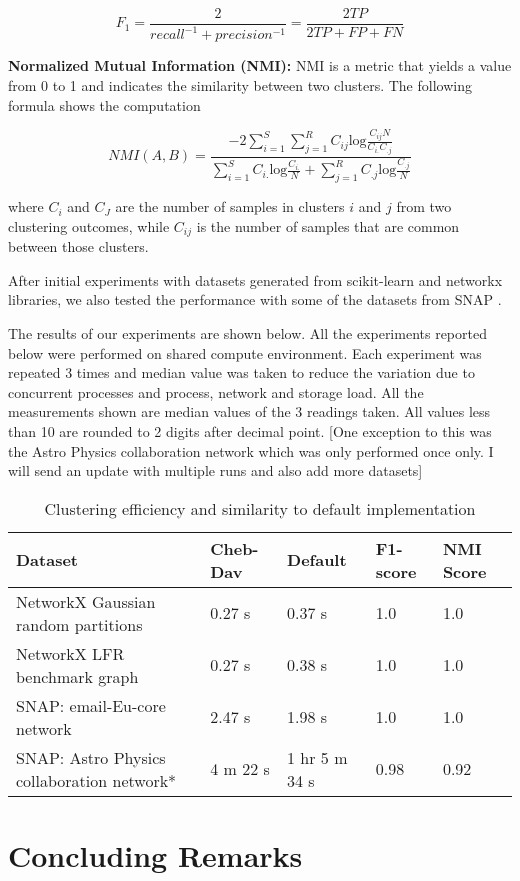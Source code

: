 \documentclass[10pt,a4paper, nocenter]{article}
\begin{document}
    $$F_{1} = \frac{2}{recall^{-1}+precision^{-1}} = \frac{2TP}{2TP+FP+FN}$$
    
    \textbf{Normalized Mutual Information (NMI):} NMI is a metric that yields a value from 0 to 1 and indicates the similarity between two clusters. The following formula shows the computation
    
    $$NMI\left(A,B\right)=\frac{-2\sum_{i=1}^{S}\sum_{j=1}^{R}{C}_{ij}{\text{log}}\frac{{C}_{ij}N}{{C}_{i.}{C}_{.j}}}{\sum_{i=1}^{S}{C}_{i.}{\text{log}}\frac{{C}_{i.}}{N}+\sum_{j=1}^{R}{C}_{.j}{\text{log}}\frac{{C}_{.j}}{N}}$$
    
    where $C_i$ and $C_J$ are the number of samples in clusters $i$ and $j$ from two clustering outcomes, while $C_{ij}$ is the number of samples that are common between those clusters.
    
    
    After initial experiments with datasets generated from scikit-learn and networkx libraries, we also tested the performance with some of the datasets from SNAP \cite{snapnets}.
    
    The results of our experiments are shown below. All the experiments reported below were performed on shared compute environment. Each experiment was repeated 3 times and median value was taken to reduce the variation due to concurrent processes and process, network and storage load. All the measurements shown are median values of the 3 readings taken. All values less than 10 are rounded to 2 digits after decimal point. [One exception to this was the Astro Physics collaboration network which was only performed once only. I will send an update with multiple runs and also add more datasets]
    
	\begin{table}[]
		\centering
		\begin{tabular}{|l|l|l|l|l|}
			\hline
			Dataset & Cheb-Dav & Default & F1-score & NMI Score \\ \hline
			NetworkX Gaussian random partitions & 0.27 s & 0.37 s & 1.0 & 1.0 \\ \hline
			NetworkX LFR benchmark graph & 0.27 s & 0.38 s  & 1.0 & 1.0 \\ \hline
			SNAP: email-Eu-core network & 2.47 s & 1.98 s & 1.0 & 1.0 \\ \hline
			SNAP: Astro Physics collaboration network* & 4 m 22 s & 1 hr 5 m 34 s & 0.98 & 0.92 \\ \hline
		\end{tabular}
		\caption{Clustering efficiency and similarity to default implementation}
		\label{tab:results}
	\end{table}


    
    \section{Concluding Remarks}
    
	\thispagestyle{fancy}
	
	 
	
\end{document}
